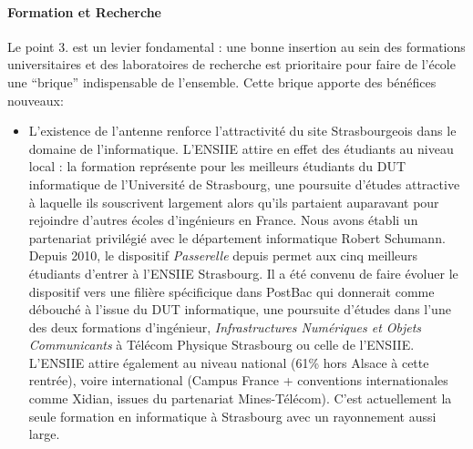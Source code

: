 \documentclass[11pt]{article}
\begin{document}
\paragraph{Formation et Recherche}
Le  point 3.   est un  levier  fondamental :  une  bonne insertion  au sein  des
formations universitaires et des laboratoires  de recherche est prioritaire pour
faire  de  l'école une  ``brique''  indispensable  de l'ensemble.  Cette  brique
apporte des bénéfices nouveaux:
\begin{itemize}

\item L'existence  de l'antenne  renforce l'attractivité du  site Strasbourgeois
  dans le domaine  de l'informatique. L'ENSIIE attire en effet  des étudiants au
  niveau local  : la formation  représente pour  les meilleurs étudiants  du DUT
  informatique de l'Université de  Strasbourg, une poursuite d'études attractive
  à laquelle  ils souscrivent largement  alors qu'ils partaient  auparavant pour
  rejoindre  d'autres  écoles d'ingénieurs  en  France.   Nous avons  établi  un
  partenariat    privilégié   avec    le    département   informatique    Robert
  Schumann. Depuis  2010, le dispositif  \textit {Passerelle} depuis  permet aux
  cinq meilleurs étudiants  d'entrer à l'ENSIIE Strasbourg. Il a  été convenu de
  faire évoluer  le dispositif  vers une filière  spécificique dans  PostBac qui
  donnerait comme débouché à l'issue du DUT informatique, une poursuite d'études
  dans l'une des deux formations d'ingénieur, \textit{Infrastructures Numériques
    et Objets Communicants} à Télécom  Physique Strasbourg ou celle de l'ENSIIE.
  L'ENSIIE  attire  également au  niveau  national  (61\%  hors Alsace  à  cette
  rentrée),  voire international  (Campus France  + conventions  internationales
  comme  Xidian, issues  du partenariat  Mines-Télécom).  C'est  actuellement la
  seule formation en informatique à Strasbourg avec un rayonnement aussi large.


\end{itemize}
\end{document}
